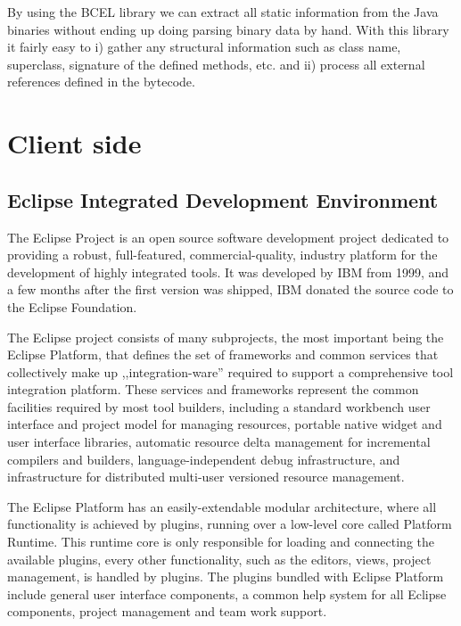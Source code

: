 By using the BCEL library we can extract all static information from the Java binaries without
ending up doing parsing binary data by hand. With this library it fairly easy to
i) gather any structural information such as class name, superclass, signature
of the defined methods, etc. and ii) process all external references defined in the 
bytecode.


\section{Client side}\label{sect:clientside}

\subsection{Eclipse Integrated Development Environment~\cite{Eclipseproject}}
The Eclipse Project is an open source software development
project dedicated to providing a robust, full-featured, commercial-quality,
industry platform for the development of highly integrated tools. It was
developed by IBM from 1999, and a few months after the first version was
shipped, IBM donated the source code to the Eclipse Foundation.

The Eclipse project consists of many subprojects, the most important being the
Eclipse Platform, that defines the set of frameworks and common services that
collectively make up ,,integ\-ration-ware'' required to support a comprehensive
tool integration platform. These services and frameworks represent the common
facilities required by most tool builders, including a standard workbench user
interface and project model for managing resources, portable native widget and
user interface libraries, automatic resource delta management for incremental
compilers and builders, language-independent debug infrastructure, and
infrastructure for distributed multi-user versioned resource management.

The Eclipse Platform has an easily-extendable modular architecture, where all
functionality is achieved by plugins, running over a low-level core called
Platform Runtime. This runtime core is only responsible for loading and
connecting the available plugins, every other functionality, such as the
editors, views, project management, is handled by plugins. The plugins bundled
with Eclipse Platform include general user interface components, a common help
system for all Eclipse components, project management and team work support.

